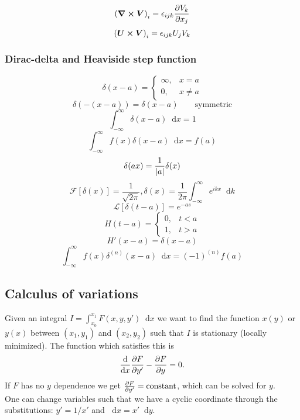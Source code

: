 \documentclass[a4paper, 10pt]{article}
\newcommand*\diff{\mathop{}\!\mathrm{d}}
\begin{document}
\begin{multicols*}{3}
$$ \left( \bm{\nabla} \cross \bm{V}\right)_i = \epsilon_{ijk}\pdv{V_k}{x_j}$$
$$ \left( \bm{U} \cross \bm{V}\right)_i = \epsilon_{ijk}U_jV_k$$

\subsubsection*{Dirac-delta and Heaviside step function}
\[
\delta(x-a)=\begin{cases}
\infty, & x=a \\
0, &  x\neq a
\end{cases}\]
$$ \delta(-(x-a)) = \delta(x-a) \qquad \text{symmetric}$$
$$ \int_{-\infty}^{\infty} \delta(x-a) \diff x = 1$$
$$ \int_{-\infty}^{\infty} f(x) \delta(x-a) \diff x = f(a)$$
$$ \delta(ax) = \frac{1}{\abs{a}}\delta(x)$$
$$ \mathcal{F}\left[ \delta(x) \right] = \frac{1}{\sqrt{2\pi}}, \delta(x) = \frac{1}{2\pi}\int_{-\infty}^{\infty}e^{ikx}\diff k$$
$$ \mathcal{L}\left[ \delta(t-a) \right] = e^{-as}$$
\[
H(t-a)=\begin{cases}
0, & t<a\\
1, & t>a
\end{cases}\]
$$ H'(x-a) = \delta(x-a) $$
$$ \int_{-\infty}^{\infty} f(x) \delta^{(n)}(x-a) \diff x = (-1)^{(n)}f(a)$$



\begin{mdframed}
\subsection*{Calculus of variations}
\end{mdframed}
Given an integral $I=\int_{x_0}^{x_1} F(x, y, y') \diff x$ we want to find the function $x(y)$ or $y(x)$ between $(x_1, y_1)$ and $(x_2, y_2)$ such that $I$ is stationary (locally minimized). The function which satisfies this is
$$ \dv{}{x}\pdv{F}{y'} - \pdv{F}{y} = 0.$$
If $F$ has no $y$ dependence we get $\pdv{F}{y'}=\text{constant}$, which can be solved for $y$. \\
One can change variables such that we have a cyclic coordinate through the substitutions: $y' = 1/x'$ and $\diff x = x' \diff y$.
\begin{mdframed}

\end{mdframed}
\end{multicols*}
\end{document}
